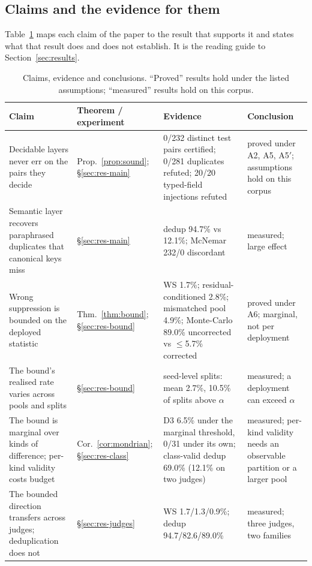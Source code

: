 \subsection{Claims and the evidence for them}

Table~\ref{tab:claims} maps each claim of the paper to the result that supports it and states what that result does and does not establish. It is the reading guide to Section~\ref{sec:results}.

\begin{table}[!tbp]
\centering\scriptsize\linespread{1.0}\selectfont\setlength{\tabcolsep}{3.5pt}
\caption{Claims, evidence and conclusions. ``Proved'' results hold under the listed assumptions; ``measured'' results hold on this corpus.}\label{tab:claims}
\begin{tabularx}{\linewidth}{@{}p{2.8cm}p{2.3cm}Xp{2.7cm}@{}}
\toprule
Claim & Theorem / experiment & Evidence & Conclusion \\
\midrule
Decidable layers never err on the pairs they decide & Prop.~\ref{prop:sound}; §\ref{sec:res-main} & 0/232 distinct test pairs certified; 0/281 duplicates refuted; 20/20 typed-field injections refuted & proved under A2, A5, A5$'$; assumptions hold on this corpus \\
Semantic layer recovers paraphrased duplicates that canonical keys miss & §\ref{sec:res-main} & dedup 94.7\% vs 12.1\%; McNemar 232/0 discordant & measured; large effect \\
Wrong suppression is bounded on the deployed statistic & Thm.~\ref{thm:bound}; §\ref{sec:res-bound} & WS 1.7\%; residual-conditioned 2.8\%; mismatched pool 4.9\%; Monte-Carlo 89.0\% uncorrected vs $\le$5.7\% corrected & proved under A6; marginal, not per deployment \\
The bound's realised rate varies across pools and splits & §\ref{sec:res-bound} & seed-level splits: mean 2.7\%, 10.5\% of splits above $\alpha$ & measured; a deployment can exceed $\alpha$ \\
The bound is marginal over kinds of difference; per-kind validity costs budget & Cor.~\ref{cor:mondrian}; §\ref{sec:res-class} & D3 6.5\% under the marginal threshold, 0/31 under its own; class-valid dedup 69.0\% (12.1\% on two judges) & measured; per-kind validity needs an observable partition or a larger pool \\
The bounded direction transfers across judges; deduplication does not & §\ref{sec:res-judges} & WS 1.7/1.3/0.9\%; dedup 94.7/82.6/89.0\% & measured; three judges, two families \\

\end{tabularx}
\end{table}
